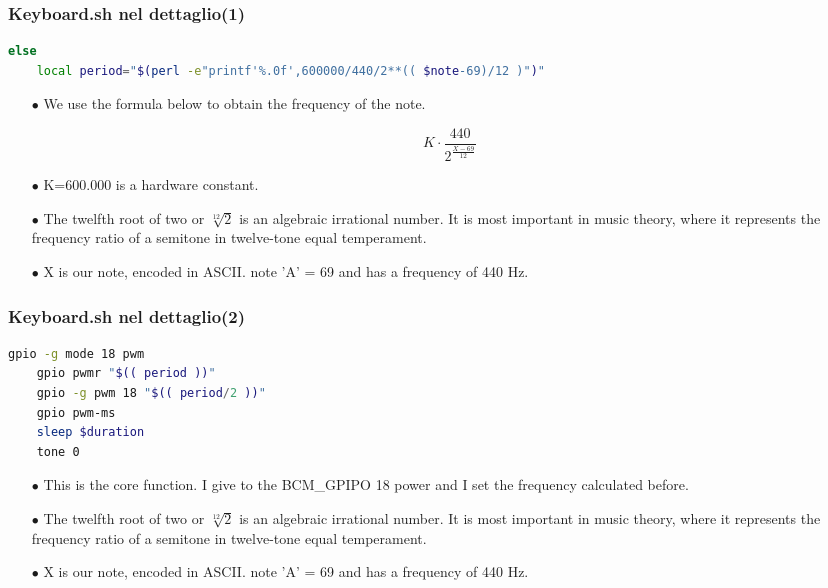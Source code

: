 \documentclass{beamer}
\begin{document}

\begin{frame}[fragile]
	\frametitle{\textbf{Keyboard.sh nel dettaglio(1)}}
  \begin{lstlisting}[language=bash]
 else
    local period="$(perl -e"printf'%.0f',600000/440/2**(( $note-69)/12 )")"
  \end{lstlisting}
  \begin{itemize}
  	\item[$\bullet$] We use the formula below to obtain the frequency of the note.
  	
  	\begin{center}
  		\begin{equation}
  			K\cdot\frac{440}{2^{\frac{X-69}{12}}}
  		\end{equation}
  	\end{center}
  		
  	
  	\item[$\bullet$] K=600.000 is a hardware constant.
  	\item[$\bullet$] 
The twelfth root of two or $\sqrt[12]{2}$ is an algebraic irrational number. It is most important in music theory, where it represents the frequency ratio of a semitone in twelve-tone equal temperament.
  	\item[$\bullet$] X is our note, encoded in ASCII. note 'A' = 69 and has a frequency of 440 Hz.
  \end{itemize}
\end{frame}



\begin{frame}[fragile]
	\frametitle{\textbf{Keyboard.sh nel dettaglio(2)}}
  \begin{lstlisting}[language=bash]
 gpio -g mode 18 pwm
    gpio pwmr "$(( period ))"
    gpio -g pwm 18 "$(( period/2 ))"
    gpio pwm-ms
    sleep $duration
    tone 0
  \end{lstlisting}
  \begin{itemize}
  	\item[$\bullet$] This is the core function. I give to the BCM_GPIPO 18 power and I set the frequency calculated before.  
  	\item[$\bullet$] 
The twelfth root of two or $\sqrt[12]{2}$ is an algebraic irrational number. It is most important in music theory, where it represents the frequency ratio of a semitone in twelve-tone equal temperament.
  	\item[$\bullet$] X is our note, encoded in ASCII. note 'A' = 69 and has a frequency of 440 Hz.
  \end{itemize}
\end{frame}
\end{document}
